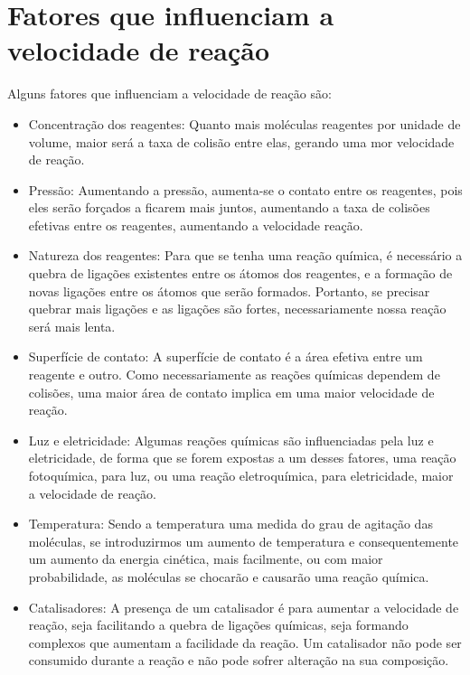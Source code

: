 \section{Fatores que influenciam a velocidade de reação}
Alguns fatores que influenciam a velocidade de reação são:
\begin{itemize}
    \item {Concentração dos reagentes: Quanto mais moléculas reagentes por unidade de volume, maior
    será a taxa de colisão entre elas, gerando uma mor velocidade de reação.}
    \item {Pressão: Aumentando a pressão, aumenta-se o contato entre os reagentes, pois eles serão
    forçados a ficarem mais juntos, aumentando a taxa de colisões efetivas entre os reagentes, aumentando
    a velocidade reação.}
    \item {Natureza dos reagentes: Para que se tenha uma reação química, é necessário a quebra de
    ligações existentes entre os átomos dos reagentes, e a formação de novas ligações entre os átomos
    que serão formados. Portanto, se precisar quebrar mais ligações e as ligações são fortes,
    necessariamente nossa reação será mais lenta.}
    \item {Superfície de contato: A superfície de contato é a área efetiva entre um reagente e
    outro. Como necessariamente as reações químicas dependem de colisões, uma maior área de contato 
    implica em uma maior velocidade de reação.}
    \item {Luz e eletricidade: Algumas reações químicas são influenciadas pela luz e eletricidade,
    de forma que se forem expostas a um desses fatores, uma reação fotoquímica, para luz, ou uma
    reação eletroquímica, para eletricidade, maior a velocidade de reação.}
    \item {Temperatura: Sendo a temperatura uma medida do grau de agitação das moléculas, se
    introduzirmos um aumento de temperatura e consequentemente um aumento da energia cinética, mais 
    facilmente, ou com maior probabilidade, as moléculas se chocarão e causarão uma reação química.}
    \item {Catalisadores: A presença de um catalisador é para aumentar a velocidade de reação, seja 
    facilitando a quebra de ligações químicas, seja formando complexos que aumentam a facilidade da reação.
    Um catalisador não pode ser consumido durante a reação e não pode sofrer alteração na sua
    composição.}
\end{itemize}
